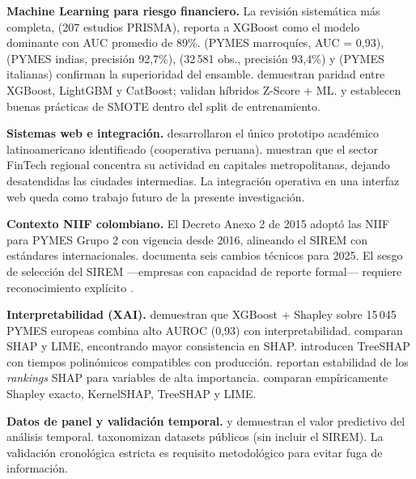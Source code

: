 \documentclass[12pt, letterpaper]{article}
\begin{document}
\textbf{Machine Learning para riesgo financiero.} La revisi\'on sistem\'atica m\'as completa, \citet{Dasilas2024} (207 estudios PRISMA), reporta a XGBoost \citep{ChenGuestrin2016} como el modelo dominante con AUC promedio de 89\%. \citet{Boumhidi2025} (PYMES marroqu\'ies, AUC = 0,93), \citet{Mahesh2025} (PYMES indias, precisi\'on 92,7\%), \citet{Yufenyuy2024} (32\,581 obs., precisi\'on 93,4\%) y \citet{Bortolotti2024} (PYMES italianas) confirman la superioridad del ensamble. \citet{Sujatha2025} demuestran paridad entre XGBoost, LightGBM y CatBoost; \citet{Wu2022} validan h\'ibridos Z-Score + ML. \citet{Sun2020} y \citet{Kristanti2025} establecen buenas pr\'acticas de SMOTE dentro del split de entrenamiento.

\textbf{Sistemas web e integraci\'on.} \citet{MayorgaLira2023} desarrollaron el \'unico prototipo acad\'emico latinoamericano identificado (cooperativa peruana). \citet{Ioannou2022} muestran que el sector FinTech regional concentra su actividad en capitales metropolitanas, dejando desatendidas las ciudades intermedias. La integraci\'on operativa en una interfaz web queda como trabajo futuro de la presente investigaci\'on.

\textbf{Contexto NIIF colombiano.} El Decreto Anexo 2 de 2015 \citep{DAFP2015} adopt\'o las NIIF para PYMES Grupo 2 con vigencia desde 2016, alineando el SIREM con est\'andares internacionales. \citet{Bubb2024} documenta seis cambios t\'ecnicos para 2025. El sesgo de selecci\'on del SIREM ---empresas con capacidad de reporte formal--- requiere reconocimiento expl\'icito \citep{ZhangZhang2026}.

\textbf{Interpretabilidad (XAI).} \citet{Bussmann2020} demuestran que XGBoost + Shapley sobre 15\,045 PYMES europeas combina alto AUROC (0,93) con interpretabilidad. \citet{Pathi2025} comparan SHAP y LIME, encontrando mayor consistencia en SHAP. \citet{LundbergTreeSHAP2020} introducen TreeSHAP con tiempos polin\'omicos compatibles con producci\'on. \citet{Lin2024} reportan estabilidad de los \textit{rankings} SHAP para variables de alta importancia. \citet{Deng2024} comparan emp\'iricamente Shapley exacto, KernelSHAP, TreeSHAP y LIME.

\textbf{Datos de panel y validaci\'on temporal.} \citet{Zhou2022} y \citet{Otsuki2022} demuestran el valor predictivo del an\'alisis temporal. \citet{Wang2024datasets} taxonomizan datasets p\'ublicos (sin incluir el SIREM). La validaci\'on cronol\'ogica estricta es requisito metodol\'ogico para evitar fuga de informaci\'on.
\end{document}
